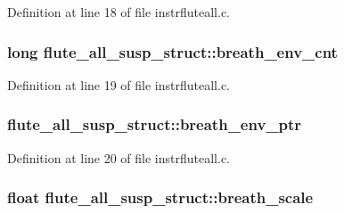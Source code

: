 Definition at line 18 of file instrfluteall.\+c.

\subsubsection[{\texorpdfstring{breath\+\_\+env\+\_\+cnt}{breath_env_cnt}}]{\setlength{\rightskip}{0pt plus 5cm}long flute\+\_\+all\+\_\+susp\+\_\+struct\+::breath\+\_\+env\+\_\+cnt}\hypertarget{structflute__all__susp__struct_a622286a136889a45a3f188decf524bf7}{}\label{structflute__all__susp__struct_a622286a136889a45a3f188decf524bf7}


Definition at line 19 of file instrfluteall.\+c.

\subsubsection[{\texorpdfstring{breath\+\_\+env\+\_\+ptr}{breath_env_ptr}}]{ flute\+\_\+all\+\_\+susp\+\_\+struct\+::breath\+\_\+env\+\_\+ptr}\hypertarget{structflute__all__susp__struct_ac46ce28b8ff7f1011bd99d666cf8fa37}{}\label{structflute__all__susp__struct_ac46ce28b8ff7f1011bd99d666cf8fa37}


Definition at line 20 of file instrfluteall.\+c.

\subsubsection[{\texorpdfstring{breath\+\_\+scale}{breath_scale}}]{\setlength{\rightskip}{0pt plus 5cm}float flute\+\_\+all\+\_\+susp\+\_\+struct\+::breath\+\_\+scale}\hypertarget{structflute__all__susp__struct_ada85859b75f8467c32abe0d94e31a823}{}\label{structflute__all__susp__struct_ada85859b75f8467c32abe0d94e31a823}


